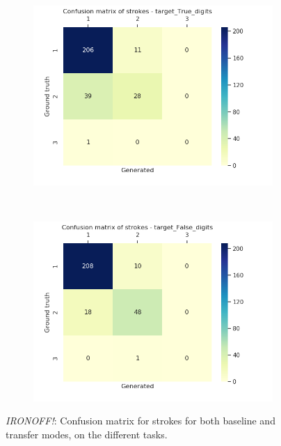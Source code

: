 \begin{figure}[!htbp]
        ~
        \begin{subfigure}[tb]{0.45\textwidth}
            \includegraphics[width=\textwidth]{images/sota/ironoff_results/True_digits_strokes_heatmap.png}
        \end{subfigure}
        ~
        \begin{subfigure}[tb]{0.45\textwidth}
            \includegraphics[width=\textwidth]{images/sota/ironoff_results/False_digits_strokes_heatmap.png}
        \end{subfigure}

        \caption{\textit{IRONOFF!}: Confusion matrix for strokes for both baseline and transfer modes, on the different tasks.}
        \label{fig:ironoff_strokes_cnf}

      \end{figure}

